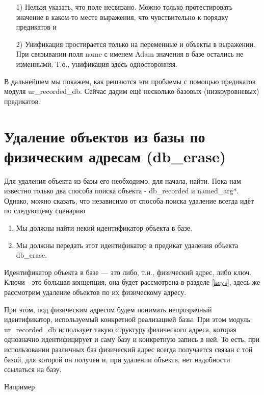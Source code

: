 \documentclass[a4paper]{book}
\def\tn{т.\thinspace н.}
\begin{document}
\begin{itemize}
\item[1)] Нельзя указать, что поле несвязано. Можно только
  протестировать значение в каком-то месте выражения, что
  чувствительно к порядку предикатов и
\item[2)] Унификация простирается только на переменные и объекты в
  выражении. При связывании поля name с именем Adam значения в
  базе остались не изменными. Т.о., унификация здесь
  односторонняя.
\end{itemize}

В дальнейшем мы покажем, как решаются эти проблемы с помощью
предикатов модуля ur\_recorded\_db. Сейчас дадим ещё несколько
базовых (низкоуровневых) предикатов.

\section{Удаление объектов из базы по физическим адресам
  (db\_erase)}
\label{db_erase}
\label{db_copy}

Для удаления объекта из базы его необходимо, для начала,
найти. Пока нам известно только два способа поиска объекта -
db\_recorded и named\_arg*. Однако, можно сказать, что независимо
от способа поиска удаление всегда идёт по следующему сценарию

\begin{enumerate}
\item Мы должны найти некий идентификатор объекта в базе.
\item Мы должны передать этот идентификатор в предикат удаления
  объекта db\_erase.
\end{enumerate}

Идентификатор объекта в базе --- это либо, \tn, физический адрес,
либо ключ. Ключи - это большая концепция, она будет рассмотрена в
разделе \ref{keys}, здесь же рассмотрим удаление объектов по их
физическому адресу.

При этом, под физическим адресом будем понимать непрозрачный
идентификатор, используемый конкретной реализацией базы. При этом
модуль ur\_recorded\_db использует такую структуру физического
адреса, которая однозначно идентифицирует и саму базу и
конкретную запись в ней. То есть, при использовании различных баз
физический адрес всегда получается связан с той базой, для
которой он получен и, при удалении объекта, нет надобности
ссылаться на базу.

Например
\end{document}
